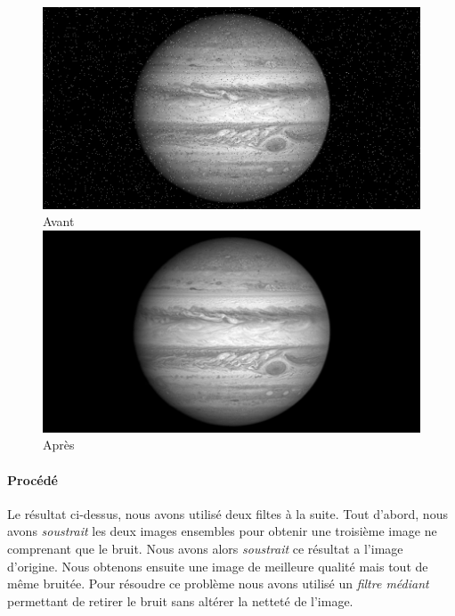 	\begin{figure}[h]
	\centering
		\begin{multicols}{2}
		\includegraphics[scale=0.325]{images/Jupiter.png}
		Avant
		\includegraphics[scale=0.325]{images/JupiterAp.png}
		Après
		\end{multicols}
	\end{figure}
	\vspace{-0.9cm}

	\paragraph{Procédé}	
		Le résultat ci-dessus, nous avons utilisé deux filtes à la suite. Tout d'abord, nous avons \emph{soustrait} les deux images ensembles pour obtenir une troisième image ne comprenant que le bruit. Nous avons alors \emph{soustrait} ce résultat a l'image d'origine. Nous obtenons ensuite une image de meilleure qualité mais tout de même bruitée. Pour résoudre ce problème nous avons utilisé un \emph{filtre médiant} permettant de retirer le bruit sans altérer la netteté de l'image.